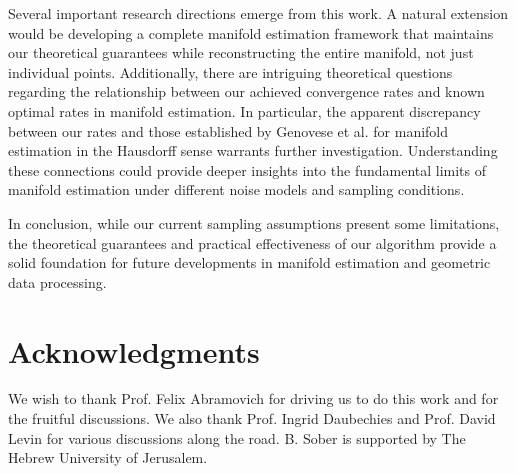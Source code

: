 \documentclass[12pt]{article}
\theoremstyle{remark}
\begin{document}
Several important research directions emerge from this work. 
A natural extension would be developing a complete manifold estimation framework that maintains our theoretical guarantees while reconstructing the entire manifold, not just individual points. 
Additionally, there are intriguing theoretical questions regarding the relationship between our achieved convergence rates and known optimal rates in manifold estimation. 
In particular, the apparent discrepancy between our rates and those established by Genovese et al. for manifold estimation in the Hausdorff sense warrants further investigation. 
Understanding these connections could provide deeper insights into the fundamental limits of manifold estimation under different noise models and sampling conditions.

In conclusion, while our current sampling assumptions present some limitations, the theoretical guarantees and practical effectiveness of our algorithm provide a solid foundation for future developments in manifold estimation and geometric data processing.



\section{Acknowledgments}
We wish to thank Prof. Felix Abramovich for driving us to do this work and for the fruitful discussions.
We also thank Prof. Ingrid Daubechies and Prof. David Levin for various discussions along the road.
B. Sober is supported by The Hebrew University of Jerusalem.
\end{document}
